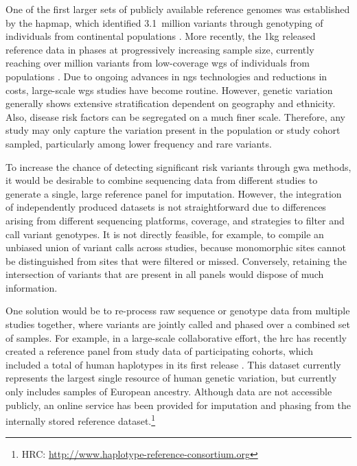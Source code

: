 One of the first larger sets of publicly available reference genomes was established by the \gls{hapmap}, which identified 3.1~million variants through genotyping of  individuals from  continental populations \citep{Frazer:2007kha, InternationalHapMapConsortium:2010en}.
More recently, the \gls{1kg} released reference data in  phases at progressively increasing sample size, currently reaching over  million variants from low-coverage \gls{wgs} of  individuals from  populations \citep{GenomesProjectConsortium:2012co, Auton:2015gk}.
Due to ongoing advances in \gls{ngs} technologies and reductions in costs, large-scale \gls{wgs} studies have become routine.
However, genetic variation generally shows extensive stratification dependent on geography and ethnicity.
Also, disease risk factors can be segregated on a much finer scale.
Therefore, any study may only capture the variation present in the population or study cohort sampled, particularly among lower frequency and rare variants.

To increase the chance of detecting significant risk variants through \gls{gwa} methods, it would be desirable to combine sequencing data from different studies to generate a single, large reference panel for imputation.
However, the integration of independently produced datasets is not straightforward due to differences arising from different sequencing platforms, coverage, and strategies to filter and call variant genotypes.
It is not directly feasible, for example, to compile an unbiased union of variant calls across studies, because monomorphic sites cannot be distinguished from sites that were filtered or missed.
Conversely, retaining the intersection of variants that are present in all panels would dispose of much information.

One solution would be to re-process raw sequence or genotype data from multiple studies together, where variants are jointly called and phased over a combined set of samples.
For example, in a large-scale collaborative effort, the \gls{hrc} has recently created a reference panel from study data of  participating cohorts, which included a total of  human haplotypes in its first release \citep{McCarthy:2016gs}.
This dataset currently represents the largest single resource of human genetic variation, but currently only includes samples of European ancestry.
Although data are not accessible publicly, an online service has been provided for imputation and phasing from the internally stored reference dataset.\footnote{HRC: \url{http://www.haplotype-reference-consortium.org} }

